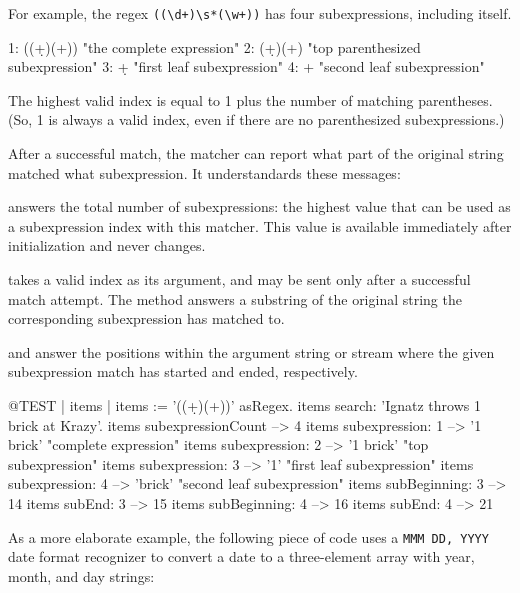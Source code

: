 \documentclass[10pt,twoside,chapterprefix=false]{scrbook}
\renewcommand{\ct}{\lstinline[mathescape=false,basicstyle={\sffamily\upshape}]}
\begin{document}
{For example, the regex \ct{((\d+)\s*(\w+))} has four subexpressions, including itself.
\begin{ToSh-code}{}
1:    ((\d+)\s*(\w+))    "the complete expression"
2:    (\d+)\s*(\w+)       "top parenthesized subexpression"
3:    \d+                      "first leaf subexpression"
4:    \w+                     "second leaf subexpression"
\end{ToSh-code}

The highest valid index is equal to 1 plus the number of matching parentheses.  (So, 1 is always a valid index, even if there are no parenthesized subexpressions.)

After a successful match, the matcher can report what part of the original string matched what subexpression. It understandards these messages:

 answers the total number of subexpressions: the highest value that can be used as a subexpression index with this matcher. This value 	is available immediately after initialization and never changes.

 takes a valid index as its argument, and may be sent only after a successful match attempt. The method answers a substring of the original string the corresponding subexpression has matched to.

 and  answer the positions within the argument string or stream where the given subexpression match has started and ended, respectively. 

\begin{ToSh-code}{@TEST | items |}
items := '((\d+)\s*(\w+))' asRegex.
items search: 'Ignatz throws 1 brick at Krazy'.
items subexpressionCount --> 4
items subexpression: 1      --> '1 brick'    "complete expression"
items subexpression: 2      --> '1 brick'    "top subexpression"
items subexpression: 3      --> '1'             "first leaf subexpression"
items subexpression: 4      --> 'brick'       "second leaf subexpression"
items subBeginning: 3       --> 14
items subEnd: 3                 --> 15
items subBeginning: 4       --> 16
items subEnd: 4                 --> 21
\end{ToSh-code}

As a more elaborate example, the following piece of code uses a \ct{MMM DD, YYYY} date format recognizer to convert a date to a three-element array with year, month, and day strings:

}
\end{document}
